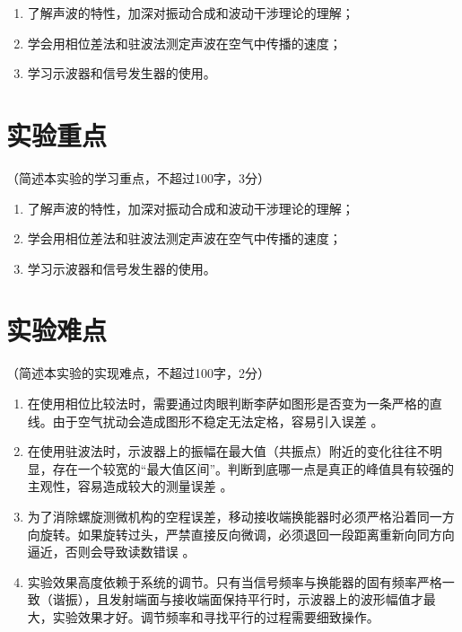 \documentclass[10pt,a4paper]{ctexart}
\newcommand{\xiaosi}{\fontsize{12pt}{16pt}\selectfont}
\begin{document}
    \begin{enumerate}   
        \item 了解声波的特性，加深对振动合成和波动干涉理论的理解；
        \item 学会用相位差法和驻波法测定声波在空气中传播的速度；
        \item 学习示波器和信号发生器的使用。
    \end{enumerate}  
    
    \section{实验重点}

    \xiaosi（简述本实验的学习重点，不超过100字，3分）


    \begin{enumerate}   
        \item 了解声波的特性，加深对振动合成和波动干涉理论的理解；
        \item 学会用相位差法和驻波法测定声波在空气中传播的速度；
        \item 学习示波器和信号发生器的使用。
    \end{enumerate}  
    
    
    \section{实验难点}
    
    \xiaosi（简述本实验的实现难点，不超过100字，2分）

\begin{enumerate}    
        \item 在使用相位比较法时，需要通过肉眼判断李萨如图形是否变为一条严格的直线。由于空气扰动会造成图形不稳定无法定格，容易引入误差 。
        \item 在使用驻波法时，示波器上的振幅在最大值（共振点）附近的变化往往不明显，存在一个较宽的“最大值区间”。判断到底哪一点是真正的峰值具有较强的主观性，容易造成较大的测量误差 。
        \item 为了消除螺旋测微机构的空程误差，移动接收端换能器时必须严格沿着同一方向旋转。如果旋转过头，严禁直接反向微调，必须退回一段距离重新向同方向逼近，否则会导致读数错误 。
        \item 实验效果高度依赖于系统的调节。只有当信号频率与换能器的固有频率严格一致（谐振），且发射端面与接收端面保持平行时，示波器上的波形幅值才最大，实验效果才好。调节频率和寻找平行的过程需要细致操作。
    \end{enumerate}  \
\end{document}
